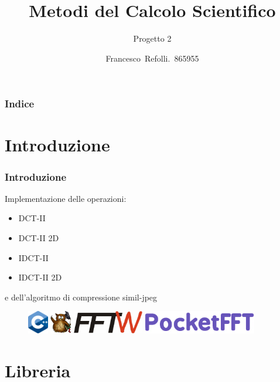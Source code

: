 \documentclass{beamer}
\title{Metodi del Calcolo Scientifico}
\subtitle{Progetto 2}
\author{Francesco~Refolli.~865955}
\begin{document}
\frame{\titlepage}

\begin{frame}
\frametitle{Indice}
\tableofcontents
\end{frame}

\section{Introduzione}

\begin{frame}
\frametitle{Introduzione}

Implementazione delle operazioni:
\begin{itemize}
  \item DCT-II
  \item DCT-II 2D
  \item IDCT-II
  \item IDCT-II 2D
\end{itemize}

e dell'algoritmo di compressione simil-jpeg

\begin{figure}
  \centering
  \includegraphics[height=1cm]{images/cpp.png}
  \hspace{0.5cm}
  \includegraphics[height=1cm]{images/eigen.png}
  \hspace{0.5cm}
  \includegraphics[height=1cm]{images/fftw.png}
  \hspace{0.5cm}
  \includegraphics[height=1cm]{images/pocketfft.png}
\end{figure}

\end{frame}

\section{Libreria}
\end{document}
